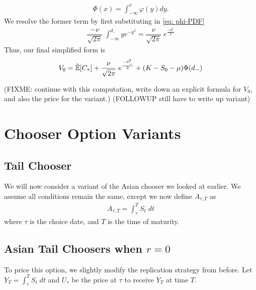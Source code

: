 \documentclass[reqno]{amsart}
\begin{document}
\begin{align} \label{eq: cdfnormal}
     \Phi(x) = \int_{-\infty}^x \varphi(y) dy.
\end{align}
We resolve the former term by first substituting in \eqref{eq: phi-PDF}
\begin{align}
     \dfrac{-\nu}{\sqrt{2\pi}} \;\int_{-\infty}^{d_{-}} ye^{-y^2} = \dfrac{\nu}{\sqrt{2\pi}} \;e^{\frac{-d_-^2}{2}}
\end{align}
Thus, our final simplified form is
\begin{align}
     V_0 = \tilde{\mathbb{E}}[C_\tau] + \dfrac{\nu}{\sqrt{2\pi}} \;e^{\frac{-d_-^2}{2}} +  (K- S_0 - \mu) \Phi(d_-) 
\end{align}

(FIXME: continue with this computation, write down an explicit formula for $V_0$, and also the price for the variant.) (FOLLOWUP still have to write up variant)

\section{Chooser Option Variants}

\subsection{Tail Chooser}
We will now consider a variant of the Asian chooser we looked at earlier. We assume all conditions remain the same, except we now define $A_{\tau, T}$ as
\begin{align}
     A_{\tau, T} = \int_\tau^T S_t \;dt
\end{align}
where $\tau$ is the choice date, and $T$ is the time of maturity.

\subsection{Asian Tail Choosers when $r = 0$}
To price this option, we slightly modify the replication strategy from before. Let $Y_T = \int_\tau^T S_t \;dt$ and $U_\tau$ be the price at $\tau$ to receive $Y_T$ at time $T$.
\end{document}
